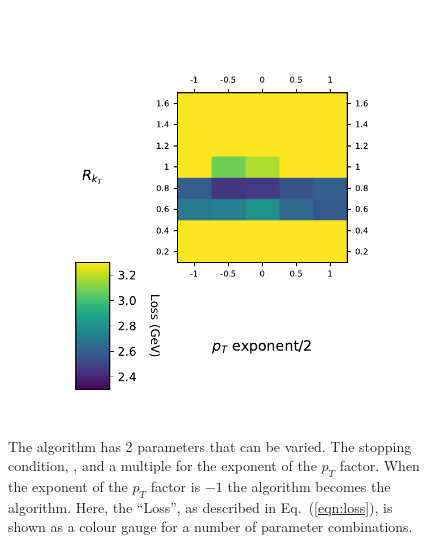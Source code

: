     \begin{figure}[!t]
        \begin{minipage}[c]{0.6\textwidth}
            \includegraphics[width=1\textwidth]{graphics/trangle_scan_genkt}
        \end{minipage}\hfill
        \begin{minipage}[c]{0.35\textwidth}
            \caption{The \genkt{} algorithm has 2 parameters that can be varied.
                The stopping condition, \ktstoppingdeltar{}, and a multiple for the exponent of the \(p_T\) factor.
                When the exponent of the \(p_T\) factor is \(-1\) the algorithm becomes the \antikt{} algorithm.
                Here, the ``Loss'', as described in Eq.~(\ref{eqn:loss}), is shown as a colour gauge for a number of parameter combinations.
             }\label{fig:scan_genkt}
        \end{minipage}
    \end{figure}    

